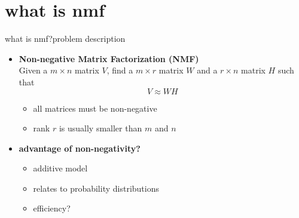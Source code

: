     \section[what is nmf]{what is nmf}
        \begin{frame}{what is nmf?}{problem description}
            \begin{itemize}
                \item   \textbf{Non-negative Matrix Factorization (NMF)}\\
                Given a $m \times n$ matrix $V$, find a $m \times r$ matrix $W$ and a $r \times n$ matrix $H$ such that
                \begin{equation*}
                V \approx WH
                \end{equation*}
                \begin{itemize}
                		\item all matrices must be non-negative
                		\item rank $r$ is usually smaller than $m$ and $n$
                \end{itemize}
              		                
                \bigskip
                \item<2->   \textbf{advantage of non-negativity?}
                    \begin{itemize}
                        \item<2->   additive model
                        \item<3->   relates to probability distributions
                        \item<4->   efficiency?
                    \end{itemize}
            \end{itemize}
        \end{frame}    
        

